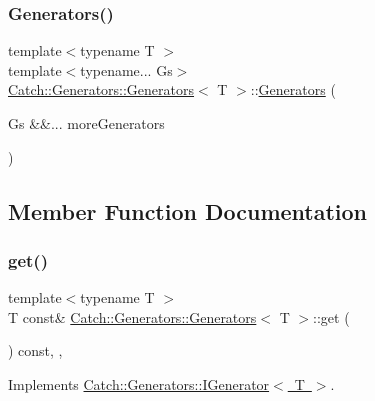 \subsubsection{\texorpdfstring{Generators()}{Generators()}}
{\footnotesize\ttfamily template$<$typename T $>$ \\
template$<$typename... Gs$>$ \\
\mbox{\hyperlink{class_catch_1_1_generators_1_1_generators}{Catch\+::\+Generators\+::\+Generators}}$<$ T $>$\+::\mbox{\hyperlink{class_catch_1_1_generators_1_1_generators}{Generators}} (\begin{DoxyParamCaption}\item[{Gs \&\&...}]{more\+Generators }\end{DoxyParamCaption})\hspace{0.3cm}{\ttfamily [inline]}}



\subsection{Member Function Documentation}
\mbox{\label{class_catch_1_1_generators_1_1_generators_a66705482b7efa88cae6e6b7062d5de6a}} 
\subsubsection{\texorpdfstring{get()}{get()}}
{\footnotesize\ttfamily template$<$typename T $>$ \\
T const\& \mbox{\hyperlink{class_catch_1_1_generators_1_1_generators}{Catch\+::\+Generators\+::\+Generators}}$<$ T $>$\+::get (\begin{DoxyParamCaption}{ }\end{DoxyParamCaption}) const\hspace{0.3cm}{\ttfamily [inline]}, {\ttfamily [override]}, {\ttfamily [virtual]}}



Implements \mbox{\hyperlink{struct_catch_1_1_generators_1_1_i_generator_a525d381fc9249a885b075a0632a8579a}{Catch\+::\+Generators\+::\+I\+Generator$<$ T $>$}}.

\mbox{\label{class_catch_1_1_generators_1_1_generators_ad127fd2a07347b527f79ab3b78bd40fb}} 
